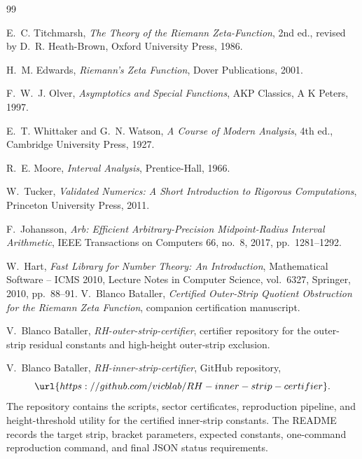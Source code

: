 \documentclass[11pt]{article}
\begin{document}
\begin{thebibliography}{99}

E.~C. Titchmarsh,
\emph{The Theory of the Riemann Zeta-Function},
2nd ed., revised by D.~R. Heath-Brown,
Oxford University Press, 1986.

H.~M. Edwards,
\emph{Riemann's Zeta Function},
Dover Publications, 2001.

F.~W.~J. Olver,
\emph{Asymptotics and Special Functions},
AKP Classics, A K Peters, 1997.

E.~T. Whittaker and G.~N. Watson,
\emph{A Course of Modern Analysis},
4th ed.,
Cambridge University Press, 1927.

R.~E. Moore,
\emph{Interval Analysis},
Prentice-Hall, 1966.

W.~Tucker,
\emph{Validated Numerics: A Short Introduction to Rigorous Computations},
Princeton University Press, 2011.

F.~Johansson,
\emph{Arb: Efficient Arbitrary-Precision Midpoint-Radius Interval Arithmetic},
IEEE Transactions on Computers 66, no.~8, 2017, pp.~1281--1292.

W.~Hart,
\emph{Fast Library for Number Theory: An Introduction},
Mathematical Software -- ICMS 2010,
Lecture Notes in Computer Science, vol.~6327,
Springer, 2010, pp.~88--91.
V.~Blanco Bataller,
\emph{Certified Outer-Strip Quotient Obstruction for the Riemann Zeta Function},
companion certification manuscript.

V.~Blanco Bataller,
\emph{RH-outer-strip-certifier},
certifier repository for the outer-strip residual constants and high-height
outer-strip exclusion.

V.~Blanco Bataller,
\emph{RH-inner-strip-certifier},
GitHub repository,
\[
        \url{https://github.com/vicblab/RH-inner-strip-certifier}.
\]
The repository contains the scripts, sector certificates, reproduction
pipeline, and height-threshold utility for the certified inner-strip constants.
The README records the target strip, bracket parameters, expected constants,
one-command reproduction command, and final JSON status requirements.
\end{thebibliography}
\end{document}
